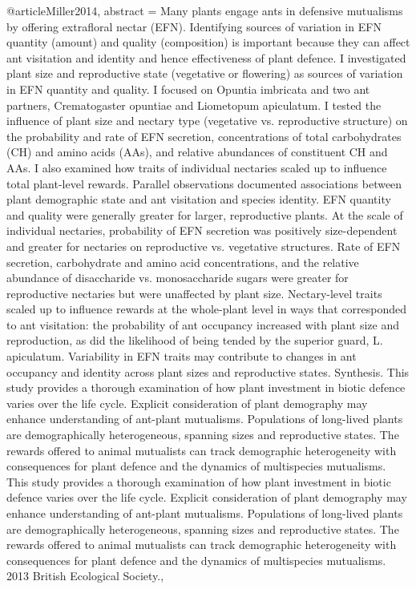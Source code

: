 @article{Miller2014,
abstract = {Many plants engage ants in defensive mutualisms by offering extrafloral nectar (EFN). Identifying sources of variation in EFN quantity (amount) and quality (composition) is important because they can affect ant visitation and identity and hence effectiveness of plant defence. I investigated plant size and reproductive state (vegetative or flowering) as sources of variation in EFN quantity and quality. I focused on Opuntia imbricata and two ant partners, Crematogaster opuntiae and Liometopum apiculatum. I tested the influence of plant size and nectary type (vegetative vs. reproductive structure) on the probability and rate of EFN secretion, concentrations of total carbohydrates (CH) and amino acids (AAs), and relative abundances of constituent CH and AAs. I also examined how traits of individual nectaries scaled up to influence total plant-level rewards. Parallel observations documented associations between plant demographic state and ant visitation and species identity. EFN quantity and quality were generally greater for larger, reproductive plants. At the scale of individual nectaries, probability of EFN secretion was positively size-dependent and greater for nectaries on reproductive vs. vegetative structures. Rate of EFN secretion, carbohydrate and amino acid concentrations, and the relative abundance of disaccharide vs. monosaccharide sugars were greater for reproductive nectaries but were unaffected by plant size. Nectary-level traits scaled up to influence rewards at the whole-plant level in ways that corresponded to ant visitation: the probability of ant occupancy increased with plant size and reproduction, as did the likelihood of being tended by the superior guard, L. apiculatum. Variability in EFN traits may contribute to changes in ant occupancy and identity across plant sizes and reproductive states. Synthesis. This study provides a thorough examination of how plant investment in biotic defence varies over the life cycle. Explicit consideration of plant demography may enhance understanding of ant-plant mutualisms. Populations of long-lived plants are demographically heterogeneous, spanning sizes and reproductive states. The rewards offered to animal mutualists can track demographic heterogeneity with consequences for plant defence and the dynamics of multispecies mutualisms. This study provides a thorough examination of how plant investment in biotic defence varies over the life cycle. Explicit consideration of plant demography may enhance understanding of ant-plant mutualisms. Populations of long-lived plants are demographically heterogeneous, spanning sizes and reproductive states. The rewards offered to animal mutualists can track demographic heterogeneity with consequences for plant defence and the dynamics of multispecies mutualisms. {\textcopyright} 2013 British Ecological Society.},
}
